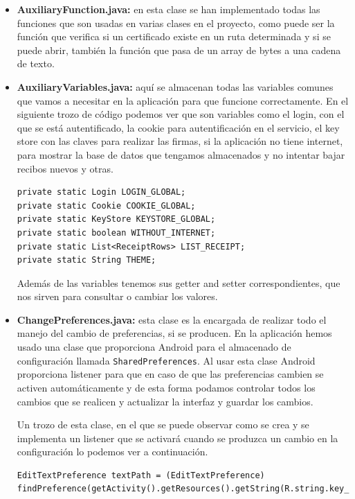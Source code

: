 \begin{itemize}

\item \textbf{AuxiliaryFunction.java:} en esta clase se han implementado todas las funciones que son usadas en varias clases en el proyecto, como puede ser la función que verifica si un certificado existe en un ruta determinada y si se puede abrir, también la función que pasa de un array de bytes a una cadena de texto. 

\item \textbf{AuxiliaryVariables.java:} aquí se almacenan todas las variables comunes que vamos a necesitar en la aplicación para que funcione correctamente. En el siguiente trozo de código podemos ver que son variables como el login, con el que se está autentificado, la cookie para autentificación en el servicio, el key store con las claves para realizar las firmas, si la aplicación no tiene internet, para mostrar la base de datos que tengamos almacenados y no intentar bajar recibos nuevos y otras.

\begin{lstlisting}[style=Java]
private static Login LOGIN_GLOBAL;
private static Cookie COOKIE_GLOBAL;
private static KeyStore KEYSTORE_GLOBAL;
private static boolean WITHOUT_INTERNET;
private static List<ReceiptRows> LIST_RECEIPT;
private static String THEME;
\end{lstlisting}

Además de las variables tenemos sus getter and setter correspondientes, que nos sirven para consultar o cambiar los valores.

\item \textbf{ChangePreferences.java:} esta clase es la encargada de realizar todo el manejo del cambio de preferencias, si se producen. En la aplicación hemos usado una clase que proporciona Android para el almacenado de configuración llamada \lstinline{SharedPreferences}. Al usar esta clase Android proporciona listener para que en caso de que las preferencias cambien se activen automáticamente y de esta forma podamos controlar todos los cambios que se realicen y actualizar la interfaz y guardar los cambios.

Un trozo de esta clase, en el que se puede observar como se crea y se implementa un listener que se activará cuando se produzca un cambio en la configuración lo podemos ver a continuación.

\begin{lstlisting}[style=Java]
EditTextPreference textPath = (EditTextPreference) findPreference(getActivity().getResources().getString(R.string.key_cert_path));


\end{lstlisting}
\end{itemize}
